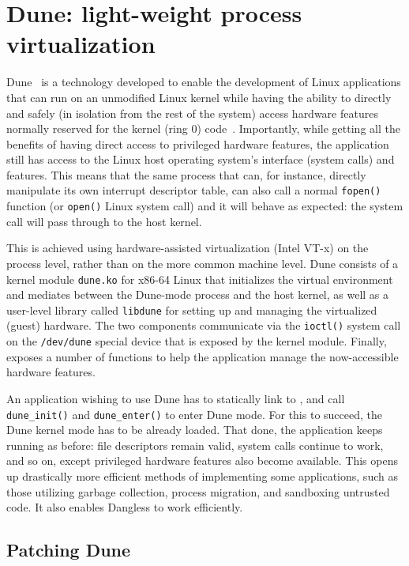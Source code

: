 \section{Dune: light-weight process virtualization}
\label{sec:bg-dune}

Dune~\cite{dune-website} is a technology developed to enable the development of Linux applications that can run on an unmodified Linux kernel while having the ability to directly and safely (in isolation from the rest of the system) access hardware features normally reserved for the kernel (ring 0) code~\cite{dune-paper}. Importantly, while getting all the benefits of having direct access to privileged hardware features, the application still has access to the Linux host operating system's interface (system calls) and features. This means that the same process that can, for instance, directly manipulate its own interrupt descriptor table, can also call a normal \lstinline!fopen()! function (or \lstinline!open()! Linux system call) and it will behave as expected: the system call will pass through to the host kernel.

This is achieved using hardware-assisted virtualization (Intel VT-x) on the process level, rather than on the more common machine level. Dune consists of a kernel module \texttt{dune.ko} for x86-64 Linux that initializes the virtual environment and mediates between the Dune-mode process and the host kernel, as well as a user-level library called \texttt{libdune} for setting up and managing the virtualized (guest) hardware. The two components communicate via the \lstinline!ioctl()! system call on the \texttt{/dev/dune} special device that is exposed by the kernel module. Finally,  exposes a number of functions to help the application manage the now-accessible hardware features.

An application wishing to use Dune has to statically link to , and call \lstinline!dune_init()! and \lstinline!dune_enter()! to enter Dune mode. For this to succeed, the Dune kernel mode has to be already loaded. That done, the application keeps running as before: file descriptors remain valid, system calls continue to work, and so on, except privileged hardware features also become available. This opens up drastically more efficient methods of implementing some applications, such as those utilizing garbage collection, process migration, and sandboxing untrusted code. It also enables Dangless to work efficiently.

\subsection{Patching Dune}

